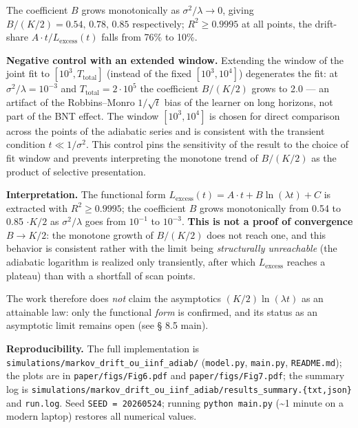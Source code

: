 \documentclass[pdflatex,sn-mathphys-ay]{sn-jnl}
\begin{document}
The coefficient \(B\) grows monotonically as \(\sigma^2/\lambda \to 0\), giving \(B/(K/2) = 0.54,\, 0.78,\, 0.85\) respectively; \(R^2 \ge 0.9995\) at all points, the drift-share \(A \cdot t / L_{\text{excess}}(t)\) falls from 76\% to 10\%.



\textbf{Negative control with an extended window.} Extending the window of the joint fit to \([10^3, T_{\text{total}}]\) (instead of the fixed \([10^3, 10^4]\)) degenerates the fit: at \(\sigma^2/\lambda = 10^{-3}\) and \(T_{\text{total}} = 2\cdot 10^5\) the coefficient \(B/(K/2)\) grows to 2.0 --- an artifact of the Robbins--Monro \(1/\sqrt t\) bias of the learner on long horizons, not part of the BNT effect. The window \([10^3, 10^4]\) is chosen for direct comparison across the points of the adiabatic series and is consistent with the transient condition \(t \ll 1/\sigma^2\). This control pins the sensitivity of the result to the choice of fit window and prevents interpreting the monotone trend of \(B/(K/2)\) as the product of selective presentation.



\textbf{Interpretation.} The functional form \(L_{\text{excess}}(t) = A\cdot t + B\ln(\lambda t) + C\) is extracted with \(R^2 \ge 0.9995\); the coefficient \(B\) grows monotonically from 0.54 to 0.85 \(\cdot K/2\) as \(\sigma^2/\lambda\) goes from \(10^{-1}\) to \(10^{-3}\). \textbf{This is not a proof of convergence \(B \to K/2\)}: the monotone growth of \(B/(K/2)\) does not reach one, and this behavior is consistent rather with the limit being \emph{structurally unreachable} (the adiabatic logarithm is realized only transiently, after which \(L_{\text{excess}}\) reaches a plateau) than with a shortfall of scan points.



The work therefore does \emph{not} claim the asymptotics \((K/2)\ln(\lambda t)\) as an attainable law: only the functional \emph{form} is confirmed, and its status as an asymptotic limit remains open (see § 8.5 main).



\textbf{Reproducibility.} The full implementation is \texttt{simulations/markov\_drift\_ou\_iinf\_adiab/} (\texttt{model.py}, \texttt{main.py}, \texttt{README.md}); the plots are in \texttt{paper/figs/Fig6.pdf} and \texttt{paper/figs/Fig7.pdf}; the summary log is \texttt{simulations/markov\_drift\_ou\_iinf\_adiab/results\_summary.\{txt,json\}} and \texttt{run.log}. Seed \texttt{SEED\ =\ 20260524}; running \texttt{python\ main.py} (\textasciitilde1 minute on a modern laptop) restores all numerical values.
\end{document}
